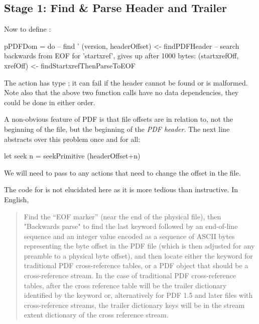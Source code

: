 \subsection{Stage 1: Find \& Parse Header and Trailer}

Now to define :
\begin{code}
pPDFDom =
    do
    -- find '%
    (version, headerOffset) <- findPDFHeader
    -- search backwards from EOF for 'startxref', gives up after 1000 bytes:
    (startxrefOff, xrefOff) <- findStartxrefThenParseToEOF
\end{code}

The action  has type ;
it can fail if the header cannot be found or is malformed.
%
Note also that the above two function calls have no data dependencies, they
could be done in either order.

A non-obvious feature of PDF is that file offsets are in relation to, not the
beginning of the file, but the beginning of the \emph{PDF header}.
%
The next line abstracts over this problem once and for all:
\begin{code}  
    let seek n = seekPrimitive (headerOffset+n)
\end{code}
We will need to pass  to any actions that need to change
the offset in the file.

The code for  is
not elucidated here as it is more tedious than instructive.
In English,
\begin{quote}
Find the ``EOF marker''  (near the end of the physical
file), then "Backwards parse" to find the last 
keyword followed by an end-of-line sequence and an integer value
encoded as a sequence of ASCII bytes representing the byte offset in
the PDF file (which is then adjusted for any preamble to a physical
byte offset), and then locate either the  keyword for
traditional PDF cross-reference tables, or a PDF object that should be
a cross-reference stream.  In the case of traditional PDF
cross-reference tables, after the cross reference table will be the
trailer dictionary identified by the  keyword or,
alternatively for PDF 1.5 and later files with cross-reference
streams, the trailer dictionary keys will be in the stream extent
dictionary of the cross reference stream.
\end{quote}

